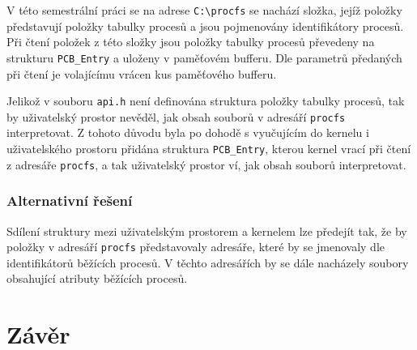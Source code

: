 \documentclass[12pt, a4paper]{article}
\let\oldsection\section
\renewcommand\section{\clearpage\oldsection}
\begin{document}
V této semestrální práci se na adrese \texttt{C:\textbackslash procfs} se nachází složka, jejíž položky představují položky tabulky procesů a jsou pojmenovány identifikátory procesů. Při čtení položek z této složky jsou položky tabulky procesů převedeny na strukturu \texttt{PCB\_Entry} a uloženy v paměťovém bufferu. Dle parametrů předaných při čtení je volajícímu vrácen kus paměťového bufferu.

Jelikož v souboru \texttt{api.h} není definována struktura položky tabulky procesů, tak by uživatelský prostor nevěděl, jak obsah souborů v adresáří \texttt{procfs} interpretovat. Z tohoto důvodu byla po dohodě s vyučujícím do kernelu i uživatelského prostoru přidána struktura \texttt{PCB\_Entry}, kterou kernel vrací při čtení z adresáře \texttt{procfs}, a tak uživatelský prostor ví, jak obsah souborů interpretovat.

\subsubsection{Alternativní řešení}
Sdílení struktury mezi uživatelským prostorem a kernelem lze předejít tak, že by položky v adresáří \texttt{procfs} představovaly adresáře, které by se jmenovaly dle identifikátorů běžících procesů. V těchto adresářích by se dále nacházely soubory obsahující atributy běžících procesů.


\section{Závěr}	
\end{document}
